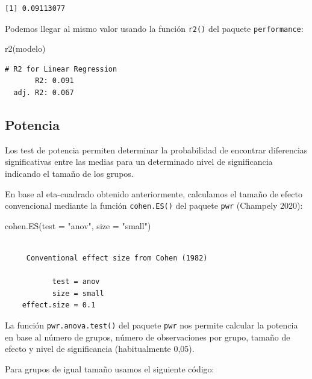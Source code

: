 \documentclass[
  spanish,
  a4paper,
]{scrbook}
\newenvironment{Shaded}{\begin{snugshade}}{\end{snugshade}}
\newcommand{\AttributeTok}[1]{\textcolor[rgb]{0.40,0.45,0.13}{#1}}
\newcommand{\FunctionTok}[1]{\textcolor[rgb]{0.28,0.35,0.67}{#1}}
\newcommand{\NormalTok}[1]{\textcolor[rgb]{0.00,0.23,0.31}{#1}}
\newcommand{\StringTok}[1]{\textcolor[rgb]{0.13,0.47,0.30}{#1}}
\begin{document}
\begin{verbatim}
[1] 0.09113077
\end{verbatim}

Podemos llegar al mismo valor usando la función \texttt{r2()} del
paquete \texttt{performance}:

\begin{Shaded}
\begin{Highlighting}[]
\FunctionTok{r2}\NormalTok{(modelo)}
\end{Highlighting}
\end{Shaded}

\begin{verbatim}
# R2 for Linear Regression
       R2: 0.091
  adj. R2: 0.067
\end{verbatim}

\subsection{Potencia}\label{potencia}

Los test de potencia permiten determinar la probabilidad de encontrar
diferencias significativas entre las medias para un determinado nivel de
significancia indicando el tamaño de los grupos.

En base al eta-cuadrado obtenido anteriormente, calculamos el tamaño de
efecto convencional mediante la función \texttt{cohen.ES()} del paquete
\texttt{pwr} (Champely 2020):

\begin{Shaded}
\begin{Highlighting}[]
\FunctionTok{cohen.ES}\NormalTok{(}\AttributeTok{test =} \StringTok{"anov"}\NormalTok{, }\AttributeTok{size =} \StringTok{"small"}\NormalTok{)}
\end{Highlighting}
\end{Shaded}

\begin{verbatim}

     Conventional effect size from Cohen (1982) 

           test = anov
           size = small
    effect.size = 0.1
\end{verbatim}

La función \texttt{pwr.anova.test()} del paquete \texttt{pwr} nos
permite calcular la potencia en base al número de grupos, número de
observaciones por grupo, tamaño de efecto y nivel de significancia
(habitualmente 0,05).

Para grupos de igual tamaño usamos el siguiente código:
\end{document}
